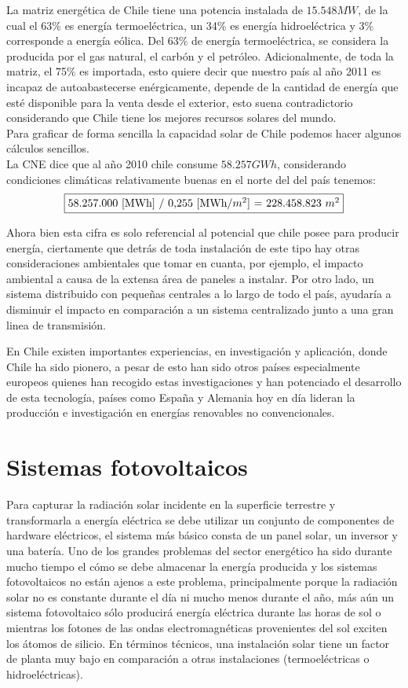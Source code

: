 \newpage
La matriz energética de Chile tiene una potencia instalada de $15.548 MW$\cite{matrizEnergia:1}, de la cual el 63\% es energía termoeléctrica, un 34\% es energía hidroeléctrica y 3\% corresponde a energía eólica. Del 63\% de energía termoeléctrica, se considera la producida por el gas natural, el carbón y el petróleo. Adicionalmente, de toda la matriz, el 75\% es importada, esto quiere decir que nuestro país al año 2011 es incapaz de autoabastecerse enérgicamente, depende de la cantidad de energía que esté disponible para la venta desde el exterior, esto suena contradictorio considerando que Chile tiene los mejores recursos solares del mundo.\\
Para graficar de forma sencilla la capacidad solar de Chile podemos hacer algunos cálculos sencillos.\\ La CNE dice que al año 2010 chile consume $58.257 GWh$, considerando condiciones climáticas relativamente buenas en el norte del del país tenemos:$$\fbox{58.257.000 [MWh] / 0,255 [MWh/$m^2$] = 228.458.823 $m^2$}$$
 
Ahora bien esta cifra es solo referencial al potencial que chile posee para producir energía, ciertamente que detrás de toda instalación de este tipo hay otras consideraciones ambientales que tomar en cuanta, por ejemplo, el impacto ambiental a causa de la extensa área de paneles a instalar. Por otro lado, un sistema distribuido con pequeñas centrales a lo largo de todo el país, ayudaría a disminuir el impacto en comparación a un sistema centralizado junto a una gran linea de transmisión.

En Chile existen importantes experiencias, en investigación y aplicación, donde Chile ha sido pionero\cite{colegioIng:2}, a pesar de esto han sido otros países especialmente europeos quienes han recogido estas investigaciones y han potenciado el desarrollo de esta tecnología, países como España y Alemania hoy en día lideran la producción e investigación en energías renovables no convencionales.\\

\section{Sistemas fotovoltaicos}
Para capturar la radiación solar incidente en la superficie terrestre y transformarla a energía eléctrica se debe utilizar un conjunto de componentes de hardware eléctricos, el sistema más básico consta de un panel solar, un inversor y una batería. Uno de los grandes problemas del sector energético ha sido durante mucho tiempo el cómo se debe almacenar la energía producida y los sistemas fotovoltaicos no están ajenos a este problema, principalmente porque la radiación solar no es constante durante el día ni mucho menos durante el año, más aún un sistema fotovoltaico sólo producirá energía eléctrica durante las horas de sol o mientras los fotones de las ondas electromagnéticas provenientes del sol exciten los átomos de silicio. En términos técnicos, una instalación solar tiene un factor de planta muy bajo en comparación a otras instalaciones (termoeléctricas o hidroeléctricas).\\

